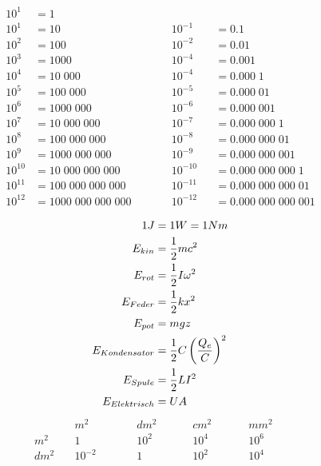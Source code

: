 \documentclass[twocolumn]{article}
\begin{document}
\begin{multicols}{2}


	\begin{alignat*}{3} 
	10^1 	&= 1 				  				  \\
	10^1 	&= 10	 			  &&10^{-1}		&&= 	0.1 \\
	10^2 	&= 100 			 	  &&10^{-2} 		&&= 	0.01 \\
	10^3 	&= 1000 		 	  &&10^{-4} 		&&= 	0.001 \\
	10^4 	&= 10\;000 		 	  &&10^{-4} 		&&= 	0.000\;1 \\
	10^5 	&= 100\;000 		 	  &&10^{-5} 		&&= 	0.000\;01 \\
	10^6 	&= 1000\;000 		 	  &&10^{-6} 		&&= 	0.000\;001 \\
	10^7 	&= 10\;000\;000 	 	  &&10^{-7} 		&&= 	0.000\;000\;1 \\
	10^8 	&= 100\;000\;000 	 	  &&10^{-8} 		&&= 	0.000\;000\;01 \\
	10^9 	&= 1000\;000\;000 	 	  &&10^{-9} 		&&= 	0.000\;000\;001 \\
	10^10 	&= 10\;000\;000\;000 	 	  &&10^{-10} 		&&= 	0.000\;000\;000\;1 \\
	10^11 	&= 100\;000\;000\;000 	 	  &&10^{-11} 		&&= 	0.000\;000\;000\;01 \\
	10^12 	&= 1000\;000\;000\;000	\qquad 	  &&10^{-12} 		&&= 	0.000\;000\;000\;001 \\
	\end{alignat*}
\begin{align*}
	\LARGE 1J &= 1W = 1Nm \\
	\normalsize
	E_{kin} &= \frac{1}{2}mc^2 \\	
	E_{rot} &= \frac{1}{2}I\omega^2 \\
	E_{Feder} &= \frac{1}{2}kx^2 \\
	E_{pot} &= mgz \\
	E_{Kondensator} &= \frac{1}{2}C\left(\frac{Q_e}{C}\right)^2 \\
	E_{Spule}	&= \frac{1}{2}LI^2 \\
	E_{Elektrisch} & = UA \\
\end{align*}
	\begin{alignat*}{4} 
		&  m^2  &&\quad   dm^2 &&\quad   cm^2 &&\quad   mm^2 \\
		m^2 \quad	& 1\quad &&\quad 10^2\quad &&\quad 10^4\quad &&\quad 10^6\quad \\
		dm^2 	\quad	& 10^{-2}\quad &&\quad 1\quad &&\quad 10^{2}\quad &&\quad 10^{4}\quad \quad \\

\end{alignat*}
\end{multicols}
\end{document}
